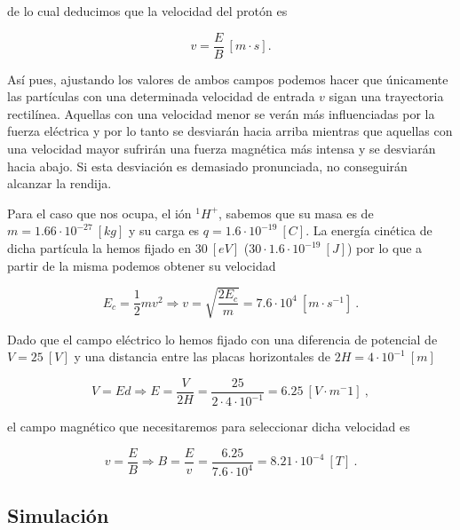 \documentclass[journal]{IEEEtran}
\begin{document}
de lo cual deducimos que la velocidad del protón es

\begin{equation}
    v = \displaystyle\frac{E}{B}~[m\cdot s].
\end{equation}

Así pues, ajustando los valores de ambos campos podemos hacer que únicamente las partículas con una determinada velocidad de entrada $v$ sigan una trayectoria rectilínea. Aquellas con una velocidad menor se verán más influenciadas por la fuerza eléctrica y por lo tanto se desviarán hacia arriba mientras que aquellas con una velocidad mayor sufrirán una fuerza magnética más intensa y se desviarán hacia abajo. Si esta desviación es demasiado pronunciada, no conseguirán alcanzar la rendija.

Para el caso que nos ocupa, el ión $^1H^+$, sabemos que su masa es de $m = 1.66\cdot 10^{-27}~[kg]$ y su carga es $q = 1.6 \cdot 10^{-19}~[C]$. La energía cinética de dicha partícula la hemos fijado en $30~[eV]$ ($30\cdot 1.6\cdot 10^{-19}~[J]$) por lo que a partir de la misma podemos obtener su velocidad

\begin{equation}
    E_c = \displaystyle\frac{1}{2}mv^2 \Rightarrow v = \sqrt{\displaystyle\frac{2E_c}{m}} = 7.6\cdot 10^4~[m\cdot s^{-1}]~.
\end{equation}

Dado que el campo eléctrico lo hemos fijado con una diferencia de potencial de $V = 25~[V]$ y una distancia entre las placas horizontales de $2H = 4\cdot 10^{-1}~[m]$

\begin{equation}
    V = Ed \Rightarrow E = \displaystyle\frac{V}{2H} = \displaystyle\frac{25}{2\cdot 4\cdot 10^{-1}} = 6.25~[V\cdot m^-1]~,
\end{equation}

el campo magnético que necesitaremos para seleccionar dicha velocidad es

\begin{equation}
    v = \displaystyle\frac{E}{B} \Rightarrow B = \displaystyle\frac{E}{v} = \displaystyle\frac{6.25}{7.6\cdot 10^4} = 8.21 \cdot 10^{-4}~[T]~.
\end{equation}

\subsection{Simulación}
\end{document}
